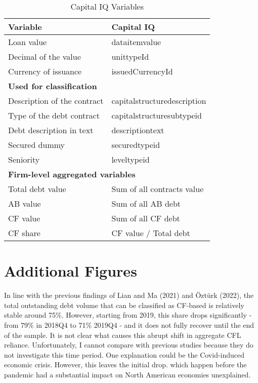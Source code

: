 \documentclass[12pt]{article}
\begin{document}
\newpage

\begin{table}[htbp]    

\centering
\caption{Capital IQ Variables}
\label{tab:CAPIQ}
\begin{tabular}{ll}
\toprule
Variable & Capital IQ \\
\midrule
Loan value & dataitemvalue \\
Decimal of the value & unittypeId \\
Currency of issuance & issuedCurrencyId \vspace{3mm} \\
\multicolumn{2}{l}{\textbf{Used for classification}} \\
Description of the contract & capitalstructuredescription \\
Type of the debt contract & capitalstructuresubtypeid \\
Debt description in text & descriptiontext \\
Secured dummy & securedtypeid \\
Seniority & leveltypeid \vspace{3mm} \\
\multicolumn{2}{l}{\textbf{Firm-level aggregated variables}} \\
Total debt value & Sum of all contracts value \\
AB value & Sum of all AB debt \\
CF value & Sum of all CF debt \\
CF share & CF value / Total debt \\
\bottomrule
\end{tabular}
\end{table}

\section{Additional Figures}

\noindent In line with the previous findings of Lian and Ma (2021) and Öztürk (2022), the total outstanding debt volume that can be classified as CF-based is relatively stable around 75\%. However, starting from 2019, this share drops significantly - from 79\% in 2018Q4 to 71\% 2019Q4 - and it does not fully recover until the end of the sample. It is not clear what causes this abrupt shift in aggregate CFL reliance. Unfortunately, I cannot compare with previous studies because they do not investigate this time period. One explanation could be the Covid-induced economic crisis. However, this leaves the initial drop. which happen before the pandemic had a substantial impact on North American economies unexplained. 
\end{document}
